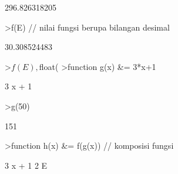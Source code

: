 \documentclass[a4paper,10pt]{article}
\begin{document}
\begin{eulernotebook}
\begin{eulercomment}
\begin{eulercomment}
\begin{eulercomment}
\begin{eulercomment}
\begin{eulercomment}
\begin{eulercomment}
\begin{eulercomment}
\begin{eulercomment}
\begin{eulercomment}
\begin{eulercomment}
\begin{eulercomment}
\begin{eulercomment}
\begin{eulercomment}
\begin{eulercomment}
\begin{eulercomment}
\begin{eulercomment}
\begin{euleroutput}
\end{euleroutput}
\begin{euleroutput}
  296.826318205
\end{euleroutput}
\begin{eulerprompt}
>f(E) // nilai fungsi berupa bilangan desimal
\end{eulerprompt}
\begin{euleroutput}
  30.308524483
\end{euleroutput}
\begin{eulerprompt}
>$f(E), $float(%
>function g(x) &= 3*x+1
\end{eulerprompt}
\begin{euleroutput}
  
                                 3 x + 1
  
\end{euleroutput}
\begin{eulerprompt}
>g(50)
\end{eulerprompt}
\begin{euleroutput}
  151
\end{euleroutput}
\begin{eulerprompt}
>function h(x) &= f(g(x)) // komposisi fungsi
\end{eulerprompt}
\begin{euleroutput}
  
                                   3 x + 1
                                2 E
  

\end{euleroutput}
\end{eulercomment}
\end{eulercomment}
\end{eulercomment}
\end{eulercomment}
\end{eulercomment}
\end{eulercomment}
\end{eulercomment}
\end{eulercomment}
\end{eulercomment}
\end{eulercomment}
\end{eulercomment}
\end{eulercomment}
\end{eulercomment}
\end{eulercomment}
\end{eulercomment}
\end{eulercomment}
\end{eulernotebook}
\end{document}
